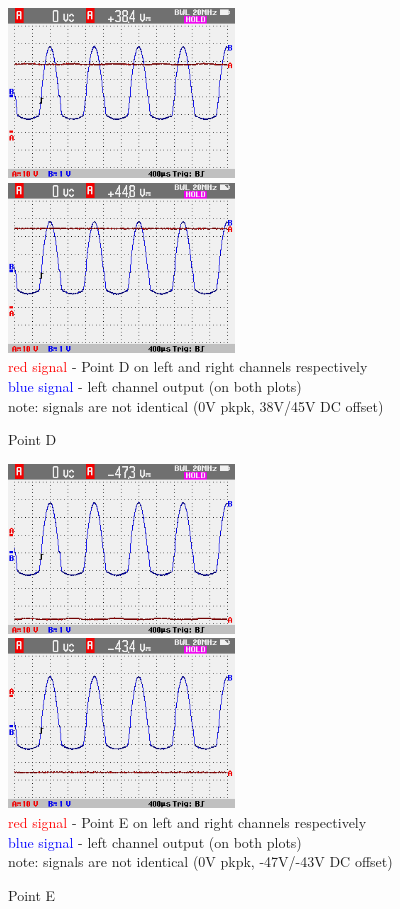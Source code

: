 \documentclass[a4paper,twoside]{report}
\begin{document}
\begin{figure}[hptb!]
    \centering
    \includegraphics[width=6cm]{img_report/left_point_D.png}
    \includegraphics[width=6cm]{img_report/right_point_D.png} \\ 
    \textcolor{Red}{red signal} - Point D on left and right channels respectively \\
    \textcolor{Blue}{blue signal} - left channel output (on both plots) \\
    note: signals are not identical (0V pkpk, 38V/45V DC offset)
 \caption{Point D}
 \label{fig:point-D}
\end{figure}

\begin{figure}[hptb!]
    \centering
    \includegraphics[width=6cm]{img_report/left_point_E.png}
    \includegraphics[width=6cm]{img_report/right_point_E.png} \\ 
    \textcolor{Red}{red signal} - Point E on left and right channels respectively \\
    \textcolor{Blue}{blue signal} - left channel output (on both plots) \\
    note: signals are not identical (0V pkpk, -47V/-43V DC offset)
 \caption{Point E}
 \label{fig:point-E}
\end{figure}
\end{document}
